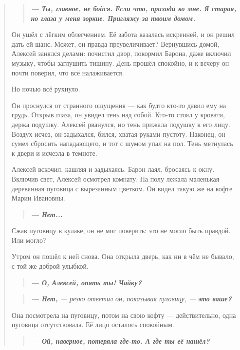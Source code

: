 \documentclass[12pt,a4paper]{book}
\newenvironment{dialogue}{\begin{quote}\itshape}{\end{quote}}
\begin{document}
\begin{dialogue}
\begin{dialogue}
\textbf{--- Ты, главное, не бойся. Если что, приходи ко мне. Я старая, но глаза у меня зоркие. Пригляжу за твоим домом.}
\end{dialogue}

Он ушёл с лёгким облегчением. Её забота казалась искренней, и он решил дать ей шанс. Может, он правда преувеличивает? Вернувшись домой, Алексей занялся делами: почистил двор, покормил Барона, даже включил музыку, чтобы заглушить тишину. День прошёл спокойно, и к вечеру он почти поверил, что всё налаживается.

Но ночью всё рухнуло.

Он проснулся от странного ощущения --- как будто кто-то давил ему на грудь. Открыв глаза, он увидел тень над собой. Кто-то стоял у кровати, держа подушку. Алексей рванулся, но тень прижала подушку к его лицу. Воздух исчез, он задыхался, бился, хватая руками пустоту. Наконец, он сумел сбросить нападающего, и тот с шумом упал на пол. Тень метнулась к двери и исчезла в темноте.

Алексей вскочил, кашляя и задыхаясь. Барон лаял, бросаясь к окну. Включив свет, Алексей осмотрел комнату. На полу лежала маленькая деревянная пуговица с вырезанным цветком. Он видел такую же на кофте Марии Ивановны.

\begin{dialogue}
\textbf{--- Нет...}
\end{dialogue}

Сжав пуговицу в кулаке, он не мог поверить: это не могло быть правдой. Или могло?

Утром он пошёл к ней снова. Она открыла дверь, как ни в чём не бывало, с той же доброй улыбкой.

\begin{dialogue}
\textbf{--- О, Алексей, опять ты! Чайку?}
\end{dialogue}

\begin{dialogue}
\textbf{--- Нет,} --- резко ответил он, показывая пуговицу, --- \textbf{это ваше?}
\end{dialogue}

Она посмотрела на пуговицу, потом на свою кофту --- действительно, одна пуговица отсутствовала. Её лицо осталось спокойным.

\begin{dialogue}
\textbf{--- Ой, наверное, потеряла где-то. А где ты её нашёл?}
\end{dialogue}


\end{dialogue}
\end{document}
